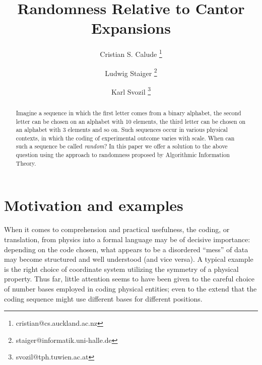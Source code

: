 \documentclass[12pt]{iopart}
\begin{document}
\title{Randomness Relative to Cantor Expansions}

\author{Cristian S. Calude
\footnote{cristian@cs.auckland.ac.nz}}
\address{Department of Computer Science,
The University of Auckland,
Private Bag 92019,
Auckland, New Zealand}

\author{Ludwig Staiger
\footnote{staiger@informatik.uni-halle.de}}
\address{Martin-Luther-Universit\"at
Halle-Wittenberg, Institut f\"ur Informatik,
{D\,-\,06099} Halle,
Germany}

\author{Karl  Svozil
\footnote{svozil@tph.tuwien.ac.at}}
\address{Institut f\"ur Theoretische Physik,
 University of Technology Vienna,
 Wiedner Hauptstra\ss e 8-10/136,
 A-1040 Vienna, Austria}


\begin{abstract}
Imagine a sequence in which the first letter comes from a binary alphabet,
the second letter can be chosen on an alphabet with 10 elements, the
third letter  can be chosen on an alphabet with 3 elements and so on.
Such sequences occur in various physical contexts,
in which the coding of experimental outcome varies with scale.
When can such a sequence be called {\it random}? In this paper we offer
a solution to the above question using the approach to randomness proposed
by Algorithmic Information Theory.
\end{abstract}

\maketitle


\section{Motivation and examples}
When it comes to comprehension and practical
usefulness, the coding,  or translation, from physics into
a formal language may be of decisive importance:
depending on the code chosen, what appears to be
a disordered ``mess'' of data may become structured and
well understood (and vice versa).
A typical example is the right choice of coordinate system utilizing the symmetry
of a physical property.
Thus far, little attention seems to have been given to
the careful choice of number bases employed in coding physical entities;
even to the extend that the coding sequence might use different bases
for different positions.
\end{document}
